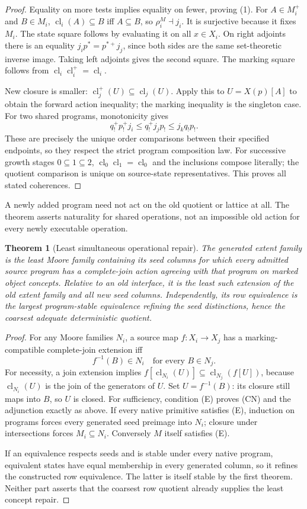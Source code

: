 \documentclass[11pt]{article}
\newtheorem{theorem}{Theorem}[section]
\theoremstyle{remark}\newtheorem{remark}[theorem]{Remark}
\newcommand{\cl}{\operatorname{cl}}
\begin{document}
\begin{proof}
Equality on more tests implies equality on fewer, proving (1).
For $A\in M_i^+$ and $B\in M_i$,
$\cl_i(A)\subseteq B$ iff $A\subseteq B$, so
$\rho_i^M\dashv j_i$. It is surjective because it fixes $M_i$.
The state square follows by evaluating it on all $x\in X_i$.
On right adjoints there is an equality
$j_i p^*=p^{*+}j_j$, since both sides are the same set-theoretic
inverse image. Taking left adjoints gives the second square. The
marking square follows from
$\cl_i\cl_i^+=\cl_i$.

New closure is smaller: $\cl_j^+(U)\subseteq\cl_j(U)$.
Apply this to $U=X(p)[A]$ to obtain the forward action inequality;
the marking inequality is the singleton case. For two shared programs,
monotonicity gives
\[
 q_!^+p_!^+j_i\leq q_!^+j_jp_!
                  \leq j_kq_!p_!.
\]
These are precisely the unique order comparisons between their
specified endpoints, so they respect the strict program composition
law. For successive growth stages $0\subseteq1\subseteq2$,
$\cl_0\cl_1=\cl_0$ and the inclusions compose literally;
the quotient comparison is unique on source-state representatives.
This proves all stated coherences.
\end{proof}
A newly added program need not act on the old quotient or lattice at all.
The theorem asserts naturality for shared operations, not an impossible
old action for every newly executable operation.

\begin{theorem}[Least simultaneous operational repair]
The generated extent family is the least Moore family containing its
seed columns for which every admitted source program has a
complete-join action agreeing with that program on marked object
concepts. Relative to an old interface, it is the least such extension
of the old extent family and all new seed columns. Independently, its
row equivalence is the largest program-stable equivalence refining the
seed distinctions, hence the coarsest adequate deterministic quotient.
\end{theorem}
\begin{proof}
For any Moore families $N_i$, a source map $f:X_i\to X_j$ has a
marking-compatible complete-join extension iff
\[
 f^{-1}(B)\in N_i\quad\text{for every }B\in N_j.\tag{E}
\]
For necessity, a join extension implies
$f[\cl_{N_i}(U)]\subseteq\cl_{N_j}(f[U])$, because
$\cl_{N_i}(U)$ is the join of the generators of $U$. Set
$U=f^{-1}(B)$: its closure still maps into $B$, so $U$ is closed.
For sufficiency, condition (E) proves (CN) and the adjunction exactly
as above. If every native primitive satisfies (E), induction on
programs forces every generated seed preimage into $N_i$; closure
under intersections forces $M_i\subseteq N_i$. Conversely $M$ itself
satisfies (E).

If an equivalence respects seeds and is stable under every native
program, equivalent states have equal membership in every generated
column, so it refines the constructed row equivalence. The latter is
itself stable by the first theorem. Neither part asserts that the
coarsest row quotient already supplies the least concept repair.
\end{proof}
\end{document}

